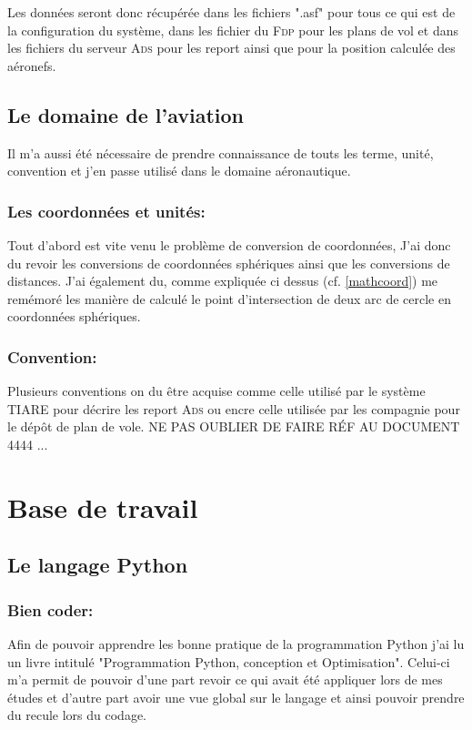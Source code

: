 Les données seront donc récupérée dans les fichiers ".asf" pour tous ce qui est de la configuration du système, dans les fichier du \textsc{Fdp} pour les plans de vol et dans les fichiers du serveur \textsc{Ads} pour les report ainsi que pour la position calculée des aéronefs.

    \subsection{Le domaine de l'aviation}
Il m'a aussi été nécessaire de prendre connaissance de touts les terme, unité, convention et j'en passe utilisé dans le domaine aéronautique.

        \subsubsection{Les coordonnées et unités:}
Tout d'abord est vite venu le problème de conversion de coordonnées, J'ai donc du revoir les conversions de coordonnées sphériques ainsi que les conversions de distances.
J'ai également du, comme expliquée ci dessus (cf. \vref{mathcoord})
me remémoré les manière de calculé le point d'intersection de deux arc de cercle en coordonnées sphériques.

        \subsubsection{Convention:}
Plusieurs conventions on du être acquise comme celle utilisé par le système TIARE pour décrire les report \textsc{Ads} ou encre celle utilisée par les compagnie pour le dépôt de plan de vole.
NE PAS OUBLIER DE FAIRE RÉF AU DOCUMENT 4444 ...





\section{Base de travail}
    \subsection{Le langage Python}
        \subsubsection{Bien coder:\label{pygood}}
Afin de pouvoir apprendre les bonne pratique de la programmation Python j'ai lu un livre intitulé "Programmation Python, conception et Optimisation"\cite{pybook}. Celui-ci m'a permit de pouvoir d'une part revoir ce qui avait été appliquer lors de mes études et d'autre part avoir une vue global sur le langage et ainsi pouvoir prendre du recule lors du codage.

